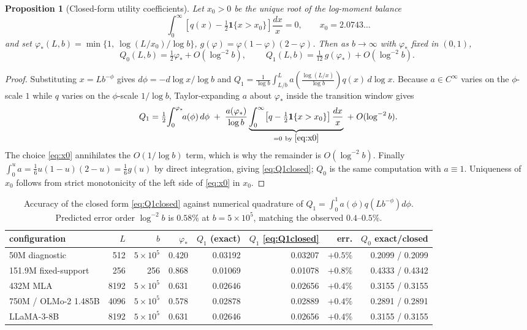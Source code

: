 \documentclass[11pt]{article}
\newtheorem{proposition}[theorem]{Proposition}
\theoremstyle{definition}
\begin{document}
\begin{proposition}[Closed-form utility coefficients]\label{prop:Q1}
Let $x_0>0$ be the unique root of the log-moment balance
\begin{equation}
\int_0^\infty\!\left[q(x)-\tfrac12\mathbf 1\{x>x_0\}\right]\frac{dx}{x}=0,
\qquad x_0=2.0743\ldots
\label{eq:x0}
\end{equation}
and set $\varphi_*(L,b)=\min\{1,\ \log(L/x_0)/\log b\}$, $g(\varphi)=\varphi(1-\varphi)(2-\varphi)$.
Then as $b\to\infty$ with $\varphi_*$ fixed in $(0,1)$,
\begin{equation}
Q_0(L,b)=\tfrac12\varphi_*+O(\log^{-2}b),\qquad
\boxed{\;Q_1(L,b)=\tfrac{1}{12}\,g(\varphi_*)+O(\log^{-2}b).\;}
\label{eq:Q1closed}
\end{equation}
\end{proposition}

\begin{proof}
Substituting $x=Lb^{-\phi}$ gives $d\phi=-d\log x/\log b$ and
$Q_1=\frac{1}{\log b}\int_{L/b}^{L}a\!\left(\tfrac{\log(L/x)}{\log b}\right)q(x)\,d\log x$.
Because $a\in C^\infty$ varies on the $\phi$-scale $1$ while $q$ varies on the $\phi$-scale
$1/\log b$, Taylor-expanding $a$ about $\varphi_*$ inside the transition window gives
\[
Q_1=\tfrac12\!\int_0^{\varphi_*}\!\!a(\phi)\,d\phi
\;+\;\frac{a(\varphi_*)}{\log b}\underbrace{\int_0^\infty\!\left[q-\tfrac12\mathbf 1\{x>x_0\}\right]\frac{dx}{x}}_{=0\ \text{by }\eqref{eq:x0}}
\;+\;O(\log^{-2}b).
\]
The choice \eqref{eq:x0} annihilates the $O(1/\log b)$ term, which is why the remainder is
$O(\log^{-2}b)$. Finally $\int_0^u a=\tfrac16 u(1-u)(2-u)=\tfrac16 g(u)$ by direct integration,
giving \eqref{eq:Q1closed}; $Q_0$ is the same computation with $a\equiv1$. Uniqueness of $x_0$
follows from strict monotonicity of the left side of \eqref{eq:x0} in $x_0$.
\end{proof}

\begin{table}[t]\centering\small
\caption{Accuracy of the closed form \eqref{eq:Q1closed} against numerical quadrature of
$Q_1=\int_0^1a(\phi)q(Lb^{-\phi})d\phi$. Predicted error order $\log^{-2}b$ is
$0.58\%$ at $b{=}5\times10^5$, matching the observed $0.4$--$0.5\%$.}
\label{tab:Q1}
\begin{tabular}{lrrrrrrr}
\toprule
configuration & $L$ & $b$ & $\varphi_*$ & $Q_1$ (exact) & $Q_1$ \eqref{eq:Q1closed} & err. & $Q_0$ exact/closed\\
\midrule
50M diagnostic       & 512  & $5{\times}10^5$ & 0.420 & 0.03192 & 0.03207 & $+0.5\%$ & 0.2099 / 0.2099\\
151.9M fixed-support & 256  & 256             & 0.868 & 0.01069 & 0.01078 & $+0.8\%$ & 0.4333 / 0.4342\\
432M MLA             & 8192 & $5{\times}10^5$ & 0.631 & 0.02646 & 0.02656 & $+0.4\%$ & 0.3155 / 0.3155\\
750M / OLMo-2 1.485B & 4096 & $5{\times}10^5$ & 0.578 & 0.02878 & 0.02889 & $+0.4\%$ & 0.2891 / 0.2891\\
LLaMA-3-8B           & 8192 & $5{\times}10^5$ & 0.631 & 0.02646 & 0.02656 & $+0.4\%$ & 0.3155 / 0.3155\\
\bottomrule
\end{tabular}
\end{table}
\end{document}
